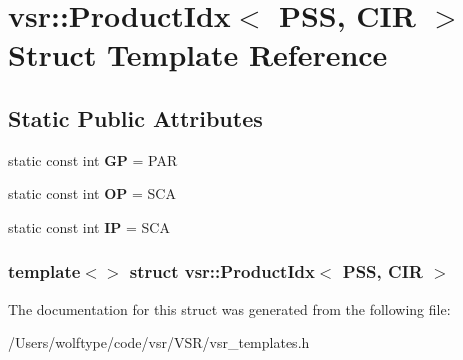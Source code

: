 \hypertarget{structvsr_1_1_product_idx_3_01_p_s_s_00_01_c_i_r_01_4}{\section{vsr\-:\-:Product\-Idx$<$ P\-S\-S, C\-I\-R $>$ Struct Template Reference}
\label{structvsr_1_1_product_idx_3_01_p_s_s_00_01_c_i_r_01_4}
}
\subsection*{Static Public Attributes}
\begin{DoxyCompactItemize}
\item 
\hypertarget{structvsr_1_1_product_idx_3_01_p_s_s_00_01_c_i_r_01_4_abdf5497ac8e2c32e5bef6ad79333b588}{static const int {\bfseries G\-P} = P\-A\-R}\label{structvsr_1_1_product_idx_3_01_p_s_s_00_01_c_i_r_01_4_abdf5497ac8e2c32e5bef6ad79333b588}

\item 
\hypertarget{structvsr_1_1_product_idx_3_01_p_s_s_00_01_c_i_r_01_4_a9f0e3b77d5608190f32381f453ff6ef4}{static const int {\bfseries O\-P} = S\-C\-A}\label{structvsr_1_1_product_idx_3_01_p_s_s_00_01_c_i_r_01_4_a9f0e3b77d5608190f32381f453ff6ef4}

\item 
\hypertarget{structvsr_1_1_product_idx_3_01_p_s_s_00_01_c_i_r_01_4_a3aca97bc5bcf93b643be7c3e7f2aba3d}{static const int {\bfseries I\-P} = S\-C\-A}\label{structvsr_1_1_product_idx_3_01_p_s_s_00_01_c_i_r_01_4_a3aca97bc5bcf93b643be7c3e7f2aba3d}

\end{DoxyCompactItemize}
\subsubsection*{template$<$$>$ struct vsr\-::\-Product\-Idx$<$ P\-S\-S, C\-I\-R $>$}



The documentation for this struct was generated from the following file\-:\begin{DoxyCompactItemize}
\item 
/\-Users/wolftype/code/vsr/\-V\-S\-R/vsr\-\_\-templates.\-h\end{DoxyCompactItemize}

